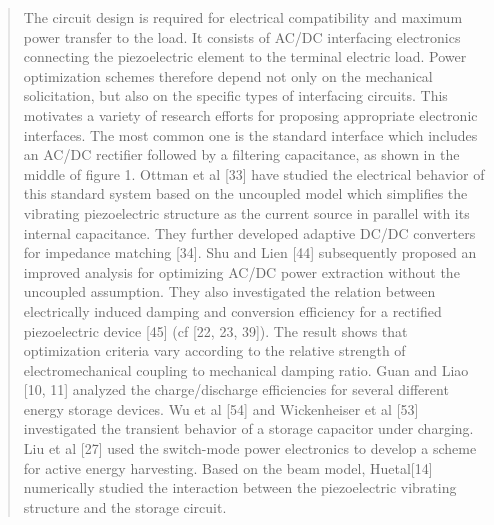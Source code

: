 \documentclass{article}
\begin{document}
\begin{quote}
    The circuit design is required for electrical compatibility
    and maximum power transfer to the load. It consists of
    AC/DC interfacing electronics connecting the piezoelectric
    element to the terminal electric load. Power optimization
    schemes therefore depend not only on the mechanical
    solicitation, but also on the specific types of interfacing
    circuits. This motivates a variety of research efforts for
    proposing appropriate electronic interfaces. The most common
    one is the standard interface which includes an AC/DC rectifier
    followed by a filtering capacitance, as shown in the middle
    of figure 1. Ottman et al [33] have studied the electrical
    behavior of this standard system based on the uncoupled model
    which simplifies the vibrating piezoelectric structure as the
    current source in parallel with its internal capacitance. They
    further developed adaptive DC/DC converters for impedance
    matching [34]. Shu and Lien [44] subsequently proposed
    an improved analysis for optimizing AC/DC power extraction
    without the uncoupled assumption. They also investigated
    the relation between electrically induced damping and
    conversion efficiency for a rectified piezoelectric device [45]
    (cf [22, 23, 39]). The result shows that optimization criteria
    vary according to the relative strength of electromechanical
    coupling to mechanical damping ratio. Guan and Liao [10, 11]
    analyzed the charge/discharge efficiencies for several different
    energy storage devices. Wu et al [54] and Wickenheiser et al
    [53] investigated the transient behavior of a storage capacitor
    under charging. Liu et al [27] used the switch-mode power
    electronics to develop a scheme for active energy harvesting.
    Based on the beam model, Huetal[14] numerically studied the
    interaction between the piezoelectric vibrating structure and
    the storage circuit.
    

\end{quote}
\end{document}
